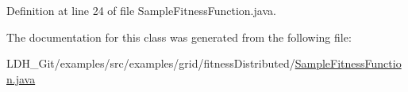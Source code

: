 Definition at line 24 of file Sample\-Fitness\-Function.\-java.



The documentation for this class was generated from the following file\-:\begin{DoxyCompactItemize}
\item 
L\-D\-H\-\_\-\-Git/examples/src/examples/grid/fitness\-Distributed/\hyperlink{grid_2fitness_distributed_2_sample_fitness_function_8java}{Sample\-Fitness\-Function.\-java}\end{DoxyCompactItemize}

